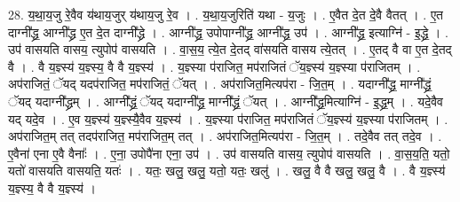 \documentclass[17pt]{extarticle}
\begin{document}
28. य॒था॒य॒जु रे॒वैव य॑थाय॒जुर् य॑थाय॒जु रे॒व । . य॒था॒य॒जुरिति॑ यथा - य॒जुः । . ए॒वैत दे॒त दे॒वै वैतत् । . ए॒त दाग्नी᳚द्ध्र॒ आग्नी᳚द्ध्र ए॒त दे॒त दाग्नी᳚द्ध्रे । . आग्नी᳚द्ध्र॒ उपोपाग्नी᳚द्ध्र॒ आग्नी᳚द्ध्र॒ उप॑ । . आग्नी᳚द्ध्र॒ इत्याग्नि॑ - इ॒द्ध्रे॒ । . उप॑ वासयति वासय॒ त्युपोप॑ वासयति । . वा॒स॒य॒ त्ये॒त दे॒तद् वा॑सयति वासय त्ये॒तत् । . ए॒तद् वै वा ए॒त दे॒तद् वै । . वै य॒ज्ञ्स्य॑ य॒ज्ञ्स्य॒ वै वै य॒ज्ञ्स्य॑ । . य॒ज्ञ्स्या प॑राजित॒ मप॑राजितं ॅय॒ज्ञ्स्य॑ य॒ज्ञ्स्या प॑राजितम् । . अप॑राजितं॒ ॅयद् यदप॑राजित॒ मप॑राजितं॒ ॅयत् । . अप॑राजित॒मित्यप॑रा - जि॒त॒म् । . यदाग्नी᳚द्ध्र॒ माग्नी᳚द्ध्रं॒ ॅयद् यदाग्नी᳚द्ध्रम् । . आग्नी᳚द्ध्रं॒ ॅयद् यदाग्नी᳚द्ध्र॒ माग्नी᳚द्ध्रं॒ ॅयत् । . आग्नी᳚द्ध्र॒मित्याग्नि॑ - इ॒द्ध्र॒म् । . यदे॒वैव यद् यदे॒व । . ए॒व य॒ज्ञ्स्य॑ य॒ज्ञ्स्यै॒वैव य॒ज्ञ्स्य॑ । . य॒ज्ञ्स्या प॑राजित॒ मप॑राजितं ॅय॒ज्ञ्स्य॑ य॒ज्ञ्स्या प॑राजितम् । . अप॑राजित॒म् तत् तदप॑राजित॒ मप॑राजित॒म् तत् । . अप॑राजित॒मित्यप॑रा - जि॒त॒म् । . तदे॒वैव तत् तदे॒व । . ए॒वैना॑ एना ए॒वै वैनाः᳚ । . ए॒ना॒ उपोपै॑ना एना॒ उप॑ । . उप॑ वासयति वासय॒ त्युपोप॑ वासयति । . वा॒स॒य॒ति॒ यतो॒ यतो॑ वासयति वासयति॒ यतः॑ । . यतः॒ खलु॒ खलु॒ यतो॒ यतः॒ खलु॑ । . खलु॒ वै वै खलु॒ खलु॒ वै । . वै य॒ज्ञ्स्य॑ य॒ज्ञ्स्य॒ वै वै य॒ज्ञ्स्य॑ । \newline
\end{document}
